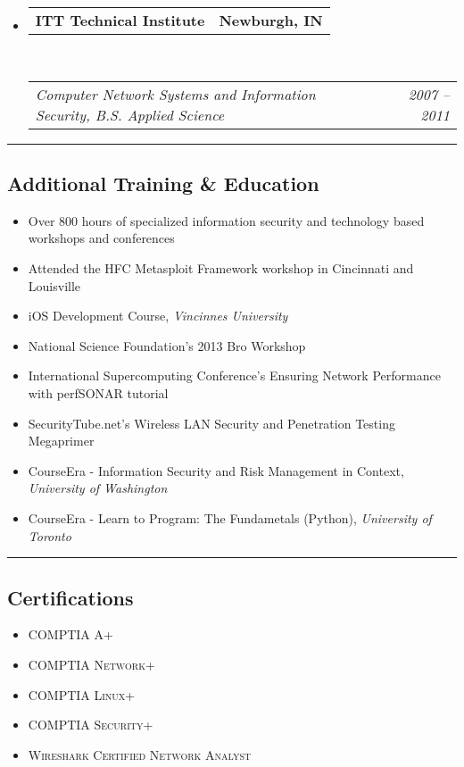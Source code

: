 \documentclass[10pt,letterpaper]{article}
\makeatletter
\newcommand{\headerrow}[2]
{\begin{tabular*}{\linewidth}{l@{\extracolsep{\fill}}r}
	#1 &
	#2 \\
\end{tabular*}}
\makeatother
\begin{document}
\begin{itemize}
	\parskip=0.1em

	\item
	\headerrow
		{\textbf{ITT Technical Institute}}
		{\textbf{Newburgh, IN}}
	\\
	\headerrow
		{\emph{Computer Network Systems and Information Security, B.S. Applied Science}}
		{\emph{2007 -- 2011}}

\end{itemize}

\hrule
\vspace{-0.4em}
\subsection*{Additional Training \& Education}

\begin{itemize}
	\parskip=0.1em

	\item Over 800 hours of specialized information security and technology based workshops and conferences
	\item Attended the HFC Metasploit Framework workshop in Cincinnati and Louisville
	\item iOS Development Course, \textit{Vincinnes University}
	\item National Science Foundation's 2013 Bro Workshop
	\item International Supercomputing Conference's Ensuring Network Performance with perfSONAR tutorial
	\item SecurityTube.net's Wireless LAN Security and Penetration Testing Megaprimer
	\item CourseEra - Information Security and Risk Management in Context, \textit{University of Washington}
	\item CourseEra - Learn to Program: The Fundametals (Python), \textit{University of Toronto}
\end{itemize}

\hrule
\vspace{-0.4em}
\subsection*{Certifications}

\begin{itemize}
	\parskip=0.1em

	\item \textsc{COMPTIA A+}
	\item \textsc{COMPTIA Network+}
	\item \textsc{COMPTIA Linux+}
	\item \textsc{COMPTIA Security+}
	\item \textsc{Wireshark Certified Network Analyst}
\end{itemize}
\end{document}
